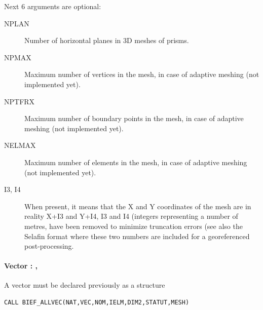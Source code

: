 Next 6 arguments are optional:
\begin{description}
\item [NPLAN] Number of horizontal planes in 3D meshes of prisms.
\item [NPMAX] Maximum number of vertices in the mesh, in case of adaptive
  meshing (not implemented yet).
\item [NPTFRX] Maximum number of boundary points in the mesh, in case of
  adaptive meshing (not implemented yet).
\item [NELMAX] Maximum number of elements in the mesh, in case of adaptive
  meshing (not implemented yet).
\item [I3, I4] When present, it means that the X and Y coordinates of the mesh
  are in reality X+I3 and Y+I4, I3 and I4 (integers representing a number of
  metres, have been removed to minimize truncation errors (see also the Selafin
  format where these two numbers are included for a georeferenced
  post-processing.
\end{description}

\paragraph{Vector :  , }

A vector must be declared previously as a  structure

\begin{lstlisting}[language=TelFortran]
CALL BIEF_ALLVEC(NAT,VEC,NOM,IELM,DIM2,STATUT,MESH)
\end{lstlisting}

